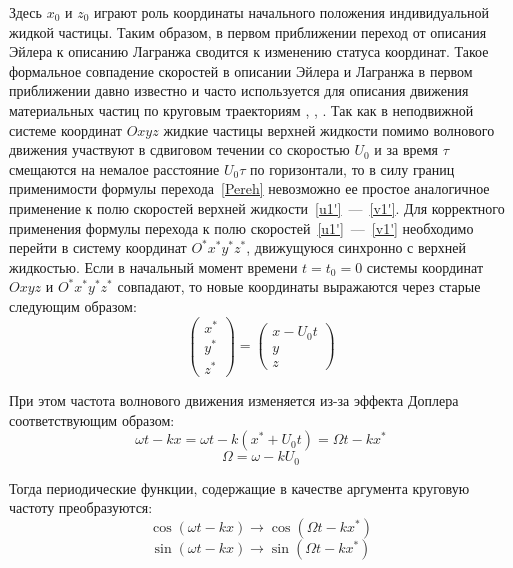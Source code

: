 Здесь $ x_{0} $ и $ z_{0} $ играют роль координаты начального положения индивидуальной жидкой частицы. Таким образом, в первом приближении переход от описания Эйлера к описанию Лагранжа сводится к изменению статуса координат. Такое формальное совпадение скоростей в описании Эйлера и Лагранжа в первом приближении давно известно и часто используется для описания движения материальных частиц по круговым траекториям \parencite{Landau}, \parencite{Levich}, \parencite{Sivukhin}. 
Так как в неподвижной системе координат $ Oxyz $ жидкие частицы верхней жидкости помимо волнового движения участвуют в сдвиговом течении со скоростью $ U_{0} $ и за время $ \tau $ смещаются на немалое расстояние $ U_{0} \tau $ по горизонтали, то в силу границ применимости формулы перехода~\eqref{Pereh} невозможно ее простое аналогичное применение к полю скоростей верхней жидкости~\eqref{u1'}~---~\eqref{v1'}. Для корректного применения формулы перехода к полю скоростей~\eqref{u1'}~---~\eqref{v1'} необходимо перейти в систему координат $ O^{*}x^{*}y^{*}z^{*} $, движущуюся синхронно с верхней жидкостью. Если в начальный момент времени $ t=t_{0}=0 $ системы координат $ Oxyz $ и $ O^{*}x^{*}y^{*}z^{*} $ совпадают, то новые координаты выражаются через старые следующим образом:
\begin{equation*}
\begin{pmatrix}
x^{*}
\\
y^{*}
\\
z^{*}
\end{pmatrix}= \begin{pmatrix}
x-U_{0}t
\\
y
\\
z
\end{pmatrix} 
\end{equation*}

При этом частота волнового движения изменяется из-за эффекта Доплера соответствующим образом:
\begin{equation}
\omega t-k x=\omega t -k \left( x^{*}+U_{0} t \right) = \Omega t -k x^{*}
\label{omega}
\end{equation}
\begin{equation*}
\Omega = \omega - k U_{0}
\end{equation*}

Тогда периодические функции, содержащие в качестве аргумента круговую частоту преобразуются:
\begin{equation*}
\cos \left( \omega t-k x \right) \rightarrow \cos \left( \Omega t -k x^{*} \right)
\end{equation*}
\begin{equation*}
\sin \left( \omega t-k x \right) \rightarrow \sin \left( \Omega t -k x^{*} \right)
\end{equation*}


